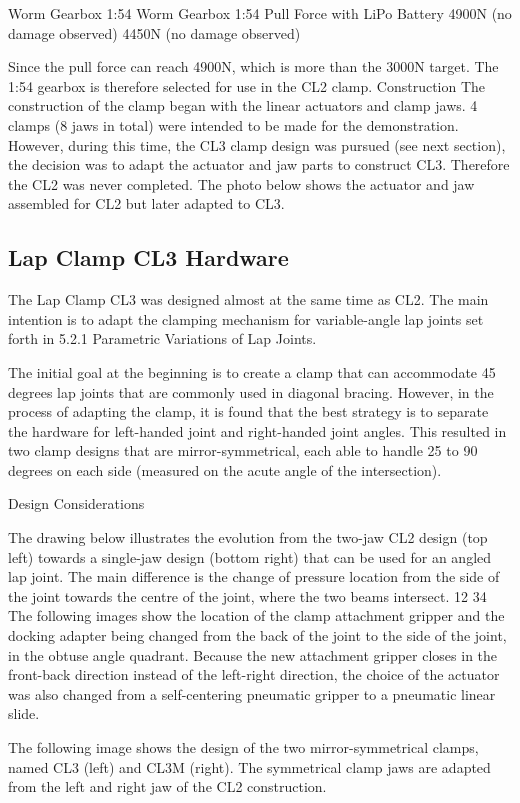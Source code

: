Worm Gearbox 1:54 
Worm Gearbox 1:54 
Pull Force with LiPo Battery
4900N (no damage observed)
4450N (no damage observed)

Since the pull force can reach 4900N, which is more than the 3000N target. The 1:54 gearbox is therefore selected for use in the CL2 clamp.
Construction 
The construction of the clamp began with the linear actuators and clamp jaws. 4 clamps (8 jaws in total) were intended to be made for the demonstration. However, during this time, the CL3 clamp design was pursued (see next section), the decision was to adapt the actuator and jaw parts to construct CL3. Therefore the CL2 was never completed. The photo below shows the actuator and jaw assembled for CL2 but later adapted to CL3.


\subsection{Lap Clamp CL3 Hardware}
The Lap Clamp CL3 was designed almost at the same time as CL2. The main intention is to adapt the clamping mechanism for variable-angle lap joints set forth in 5.2.1 Parametric Variations of Lap Joints. 

The initial goal at the beginning is to create a clamp that can accommodate 45 degrees lap joints that are commonly used in diagonal bracing. However, in the process of adapting the clamp, it is found that the best strategy is to separate the hardware for left-handed joint and right-handed joint angles. This resulted in two clamp designs that are mirror-symmetrical, each able to handle 25 to 90 degrees on each side (measured on the acute angle of the intersection). 

Design Considerations

The drawing below illustrates the evolution from the two-jaw CL2 design (top left) towards a single-jaw design (bottom right) that can be used for an angled lap joint. The main difference is the change of pressure location from the side of the joint towards the centre of the joint, where the two beams intersect.
12
34
The following images show the location of the clamp attachment gripper and the docking adapter being changed from the back of the joint to the side of the joint, in the obtuse angle quadrant. Because the new attachment gripper closes in the front-back direction instead of the left-right direction, the choice of the actuator was also changed from a self-centering pneumatic gripper to a pneumatic linear slide.


The following image shows the design of the two mirror-symmetrical clamps, named CL3 (left) and CL3M (right). The symmetrical clamp jaws are adapted from the left and right jaw of the CL2 construction.

